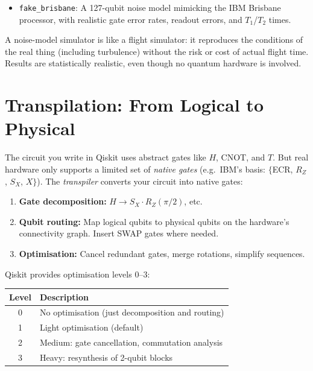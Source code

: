 \documentclass[11pt,a4paper,twoside]{report}
\theoremstyle{definition}
\newcommand{\code}[1]{\texttt{#1}}
\begin{document}
\begin{itemize}
  \item \code{fake\_brisbane}: A 127-qubit noise model mimicking the IBM
        Brisbane processor, with realistic gate error rates, readout
        errors, and $T_1$/$T_2$ times.
\end{itemize}

\begin{intuition}
A noise-model simulator is like a flight simulator: it reproduces the
conditions of the real thing (including turbulence) without the risk or
cost of actual flight time. Results are statistically realistic, even
though no quantum hardware is involved.
\end{intuition}

\section{Transpilation: From Logical to Physical}
\label{sec:transpilation}

The circuit you write in Qiskit uses abstract gates like $H$, CNOT, and
$T$. But real hardware only supports a limited set of \emph{native gates}
(e.g.\ IBM's basis: $\{$ECR, $R_Z$, $S_X$, $X$$\}$). The
\emph{transpiler} converts your circuit into native gates:

\begin{enumerate}
  \item \textbf{Gate decomposition:} $H \to S_X \cdot R_Z(\pi/2)$, etc.
  \item \textbf{Qubit routing:} Map logical qubits to physical qubits on
        the hardware's connectivity graph. Insert SWAP gates where
        needed.
  \item \textbf{Optimisation:} Cancel redundant gates, merge rotations,
        simplify sequences.
\end{enumerate}

Qiskit provides optimisation levels 0--3:

\begin{center}
\renewcommand{\arraystretch}{1.3}
\begin{tabular}{cl}
\toprule
\textbf{Level} & \textbf{Description} \\
\midrule
0 & No optimisation (just decomposition and routing) \\
1 & Light optimisation (default) \\
2 & Medium: gate cancellation, commutation analysis \\
3 & Heavy: resynthesis of 2-qubit blocks \\
\bottomrule
\end{tabular}
\end{center}
\end{document}
